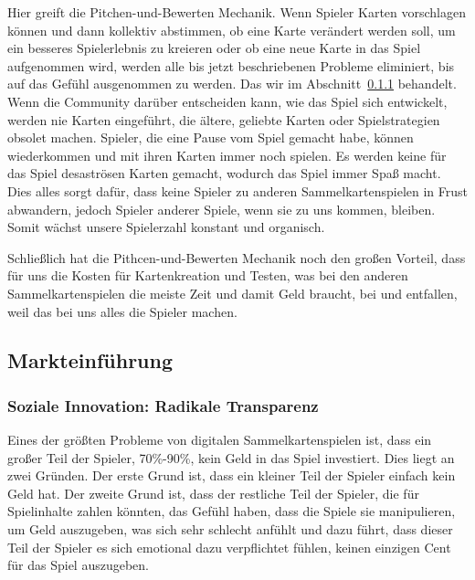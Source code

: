 \documentclass[fontsize=12]{scrartcl}
\begin{document}
	\noindent Hier greift die Pitchen-und-Bewerten Mechanik. Wenn Spieler Karten vorschlagen können und dann kollektiv abstimmen, ob eine Karte verändert werden soll, um ein besseres Spielerlebnis zu kreieren oder ob eine neue Karte in das Spiel aufgenommen wird, werden alle bis jetzt beschriebenen Probleme eliminiert, bis auf das Gefühl ausgenommen zu werden. Das wir im Abschnitt~\ref{radikale_Trasparenz} behandelt. Wenn die Community darüber entscheiden kann, wie das Spiel sich entwickelt, werden nie Karten eingeführt, die ältere, geliebte Karten oder Spielstrategien obsolet machen. Spieler, die eine Pause vom Spiel gemacht habe, können wiederkommen und mit ihren Karten immer noch spielen. Es werden keine für das Spiel desaströsen Karten gemacht, wodurch das Spiel immer Spaß macht. Dies alles sorgt dafür, dass keine Spieler zu anderen Sammelkartenspielen in Frust abwandern, jedoch Spieler anderer Spiele, wenn sie zu uns kommen, bleiben. Somit wächst unsere Spielerzahl konstant und organisch.\hfill\newline
	
	\noindent Schließlich hat die Pithcen-und-Bewerten Mechanik noch den großen Vorteil, dass für uns die Kosten für Kartenkreation und Testen, was bei den anderen Sammelkartenspielen die meiste Zeit und damit Geld braucht, bei und entfallen, weil das bei uns alles die Spieler machen.
	
	\subsection{Markteinführung}
	
	\subsubsection{Soziale Innovation: Radikale Transparenz} \label{radikale_Trasparenz}
	
	Eines der größten Probleme von digitalen Sammelkartenspielen ist, dass ein großer Teil der Spieler, 70\%-90\%, kein Geld in das Spiel investiert. Dies liegt an zwei Gründen. Der erste Grund ist, dass ein kleiner Teil der Spieler einfach kein Geld hat. Der zweite Grund ist, dass der restliche Teil der Spieler, die für Spielinhalte zahlen könnten, das Gefühl haben, dass die Spiele sie manipulieren, um Geld auszugeben, was sich sehr schlecht anfühlt und dazu führt, dass dieser Teil der Spieler es sich emotional dazu verpflichtet fühlen, keinen einzigen Cent für das Spiel auszugeben.\hfill\newline
	
\end{document}
